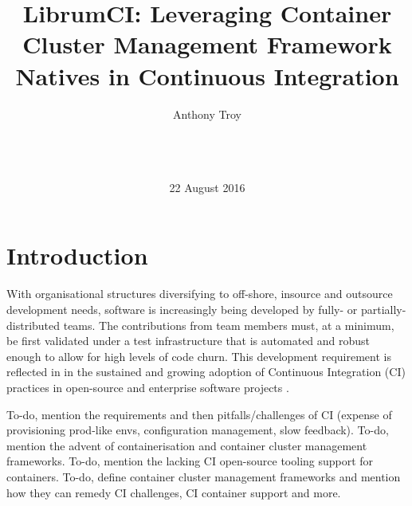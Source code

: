 \documentclass{report}
\begin{document}
\title{LibrumCI: Leveraging Container Cluster Management Framework Natives in Continuous Integration}

\author{
\alignauthor
Anthony Troy\\
       \\
       \\
       \\
}

\date{22 August 2016}

\maketitle

\begin{abstract}
\lipsum[1-2] 

\end{abstract}


\section{Introduction}
With organisational structures diversifying to off-shore, insource and outsource
development needs, software is increasingly being developed by fully- or 
partially-distributed teams. The contributions from team members must, at a minimum, be first validated
under a test infrastructure that is automated and robust enough to allow for
high levels of code churn. This development requirement is reflected in 
in the sustained and growing adoption of Continuous Integration (CI) practices in open-source and enterprise software projects \citep{Duvall, Fitz, Vas}. 
\par
To-do, mention the requirements and then pitfalls/challenges of CI (expense of provisioning prod-like envs, configuration management, slow feedback). To-do, mention the advent of containerisation and container cluster management frameworks. To-do, mention the lacking CI open-source tooling support for containers. To-do, define container cluster management frameworks and mention how they can remedy CI challenges, CI container support and more. 
\end{document}
